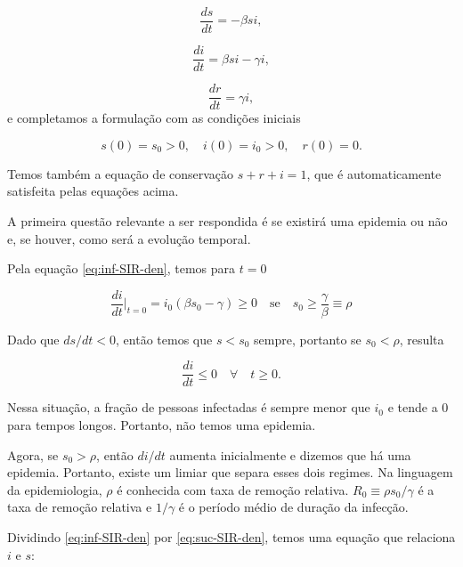 \documentclass[a4paper,11pt]{report}
\begin{document}
\begin{equation}
\frac{ds}{dt}=-\beta si,
\label{eq:suc-SIR-den}
\end{equation}

\begin{equation}
\frac{di}{dt}=\beta si-\gamma i,
\label{eq:inf-SIR-den}
\end{equation}

\begin{equation}
\frac{dr}{dt}=\gamma i,
\label{eq:rem-SIR-den}
\end{equation}
e completamos a formula\c{c}\~ao com as condi\c{c}\~oes iniciais

\begin{equation}
s(0)=s_0>0, \quad i(0)=i_0>0, \quad r(0)=0.
\end{equation}

Temos tamb\'em a equa\c{c}\~ao de conserva\c{c}\~ao $s+r+i=1$, que \'e automaticamente satisfeita pelas equa\c{c}\~oes acima. 

A primeira quest\~ao relevante a ser respondida \'e se existir\'a uma epidemia ou n\~ao e, se houver, como ser\'a a evolu\c{c}\~ao temporal.

Pela equa\c{c}\~ao \ref{eq:inf-SIR-den}, temos para $t=0$

\begin{equation}
\frac{di}{dt}\Bigg|_{t=0}=i_0(\beta s_0-\gamma)\ge 0\quad \mbox{se}\quad s_0\ge \frac{\gamma}{\beta}\equiv \rho 
\end{equation}

Dado que $ds/dt<0$, ent\~ao temos que $s<s_0$ sempre, portanto se $s_0<\rho$, resulta

\begin{equation}
\frac{di}{dt}\le 0 \quad \forall \quad t\ge 0. 
\end{equation}

Nessa situa\c{c}\~ao, a fra\c{c}\~ao de pessoas infectadas \'e sempre menor que $i_0$ e tende a 0 para tempos longos. Portanto, n\~ao temos uma epidemia. 

Agora, se $s_0>\rho$, ent\~ao $di/dt$ aumenta inicialmente e dizemos que h\'a uma epidemia. Portanto, existe um limiar que separa esses dois regimes. Na linguagem da epidemiologia, $\rho$ \'e conhecida com taxa de remo\c{c}\~ao relativa. $R_0\equiv \rho s_0/\gamma$ \'e a taxa de remo\c{c}\~ao relativa e $1/\gamma$ \'e o per\'iodo m\'edio de dura\c{c}\~ao da infec\c{c}\~ao. 

Dividindo \ref{eq:inf-SIR-den} por \ref{eq:suc-SIR-den}, temos uma equa\c{c}\~ao que relaciona $i$ e $s$:
\end{document}
